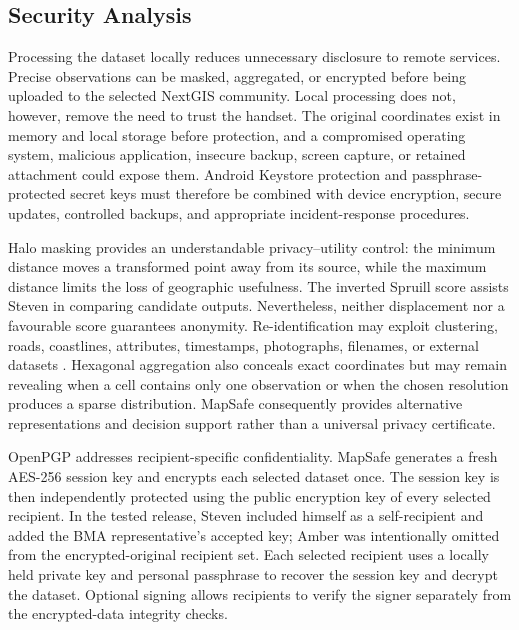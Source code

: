 \documentclass[]{interact}
\begin{document}
\subsection{Security Analysis}

Processing the dataset locally reduces unnecessary disclosure to remote services. Precise observations can be masked, aggregated, or encrypted before being uploaded to the selected NextGIS community. Local processing does not, however, remove the need to trust the handset. The original coordinates exist in memory and local storage before protection, and a compromised operating system, malicious application, insecure backup, screen capture, or retained attachment could expose them. Android Keystore protection and passphrase-protected secret keys must therefore be combined with device encryption, secure updates, controlled backups, and appropriate incident-response procedures.

Halo masking provides an understandable privacy--utility control: the minimum distance moves a transformed point away from its source, while the maximum distance limits the loss of geographic usefulness. The inverted Spruill score assists Steven in comparing candidate outputs. Nevertheless, neither displacement nor a favourable score guarantees anonymity. Re-identification may exploit clustering, roads, coastlines, attributes, timestamps, photographs, filenames, or external datasets \citep{kessler2018geoprivacy,zhang2022rehumanize,cassa2008re,zimmerman2008quantifying}. Hexagonal aggregation also conceals exact coordinates but may remain revealing when a cell contains only one observation or when the chosen resolution produces a sparse distribution. MapSafe consequently provides alternative representations and decision support rather than a universal privacy certificate.

OpenPGP addresses recipient-specific confidentiality. MapSafe generates a fresh AES-256 session key and encrypts each selected dataset once. The session key is then independently protected using the public encryption key of every selected recipient. In the tested release, Steven included himself as a self-recipient and added the BMA representative's accepted key; Amber was intentionally omitted from the encrypted-original recipient set. Each selected recipient uses a locally held private key and personal passphrase to recover the session key and decrypt the dataset. Optional signing allows recipients to verify the signer separately from the encrypted-data integrity checks.
\end{document}
